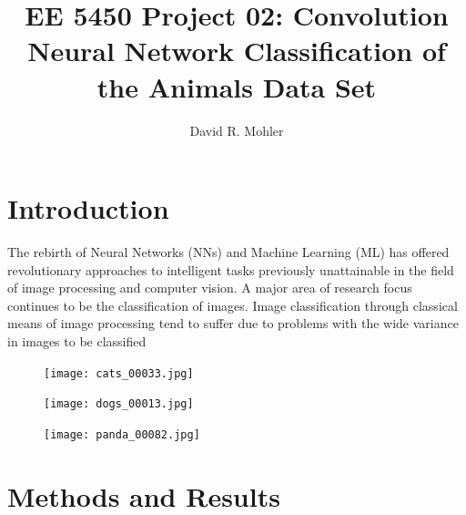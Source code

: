 \documentclass[12pt]{article}
\begin{document}
\title{EE 5450  Project 02: Convolution Neural Network Classification of the Animals Data Set}

\author{David R. Mohler}


\maketitle

\section{Introduction} 
The rebirth of Neural Networks (NNs) and Machine Learning (ML) has offered revolutionary approaches to intelligent tasks previously unattainable in the field of image processing and computer vision. A major area of research focus continues to be the classification of images. Image classification through classical means of image processing tend to suffer due to problems with the wide variance in images to be classified 
\begin{figure}[h]
	\centering %
	\captionsetup{justification=centering}
	\begin{minipage}{0.33\textwidth}
		\centering %
		\texttt{[image: cats\_00033.jpg]}
	\end{minipage}\hfill
	\begin{minipage}{0.33\textwidth}
		\centering %
		\texttt{[image: dogs\_00013.jpg]}
	\end{minipage}\hfill
	\begin{minipage}{0.33\textwidth}
		\centering %
		\texttt{[image: panda\_00082.jpg]}
	\end{minipage}\hfill
\end{figure}

\section{Methods and Results}
\end{document}
